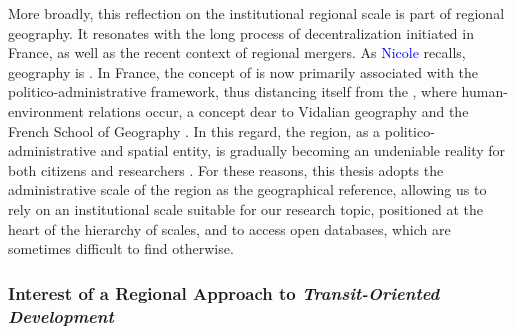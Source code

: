 \begin{refsegment}
More broadly, this reflection on the institutional regional scale is part of regional geography. It resonates with the long process of decentralization initiated in France, as well as the recent context of regional mergers. As \textcolor{blue}{Nicole} \textcolor{blue}{\textcite[107]{girard_region_2004}} recalls, geography is . In France, the concept of  is now primarily associated with the politico-administrative framework, thus distancing itself from the , where human-environment relations occur, a concept dear to Vidalian geography and the French School of Geography \textcolor{blue}{\autocite[391]{mercier_entre_2001}}. In this regard, the region, as a politico-administrative and spatial entity, is gradually becoming an undeniable reality for both citizens and researchers \textcolor{blue}{\autocite[111]{girard_region_2004}}. For these reasons, this thesis adopts the administrative scale of the region as the geographical reference, allowing us to rely on an institutional scale suitable for our research topic, positioned at the heart of the hierarchy of scales, and to access open databases, which are sometimes difficult to find otherwise.%

\subsubsection*{Interest of a Regional Approach to \textsl{Transit-Oriented Development}
    \label{chap3:approche-regionale}
    }


\end{refsegment}
